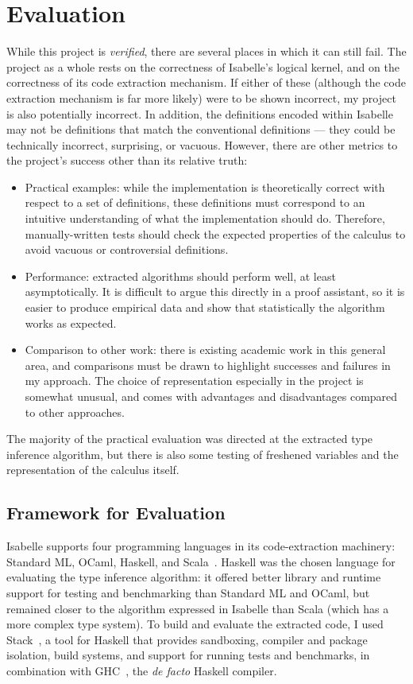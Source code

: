 \chapter{Evaluation}
While this project is \emph{verified}, there are several places in which it can still fail.
The project as a whole rests on the correctness of Isabelle's logical kernel, and on the correctness of its code extraction mechanism.
If either of these (although the code extraction mechanism is far more likely) were to be shown incorrect, my project is also potentially incorrect.
In addition, the definitions encoded within Isabelle may not be definitions that match the conventional definitions --- they could be technically incorrect, surprising, or vacuous.
However, there are other metrics to the project's success other than its relative truth:
\begin{itemize}
\item
Practical examples: while the implementation is theoretically correct with respect to a set of definitions, these definitions must correspond to an intuitive understanding of what the implementation should do.
Therefore, manually-written tests should check the expected properties of the calculus to avoid vacuous or controversial definitions.
\item
Performance: extracted algorithms should perform well, at least asymptotically.
It is difficult to argue this directly in a proof assistant, so it is easier to produce empirical data and show that statistically the algorithm works as expected.
\item
Comparison to other work: there is existing academic work in this general area, and comparisons must be drawn to highlight successes and failures in my approach.
The choice of representation especially in the project is somewhat unusual, and comes with advantages and disadvantages compared to other approaches.
\end{itemize}

The majority of the practical evaluation was directed at the extracted type inference algorithm, but there is also some testing of freshened variables and the representation of the calculus itself.

\section{Framework for Evaluation}
Isabelle supports four programming languages in its code-extraction machinery: Standard ML, OCaml, Haskell, and Scala~\cite{codegen-reference}.
Haskell was the chosen language for evaluating the type inference algorithm: it offered better library and runtime support for testing and benchmarking than Standard ML and OCaml, but remained closer to the algorithm expressed in Isabelle than Scala (which has a more complex type system).
To build and evaluate the extracted code, I used Stack~\cite{stack}, a tool for Haskell that provides sandboxing, compiler and package isolation, build systems, and support for running tests and benchmarks, in combination with GHC~\cite{GHC}, the \emph{de facto} Haskell compiler.

